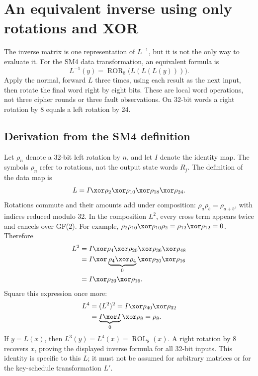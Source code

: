 \section{An equivalent inverse using only rotations and XOR}
\label{sec:sm4_inverse_rotations}
The inverse matrix is one representation of $L^{-1}$, but it is not the only
way to evaluate it. For the SM4 data transformation, an equivalent formula is
\[
\boxed{L^{-1}(y)=\operatorname{ROR}_8\bigl(L(L(L(y)))\bigr).}
\]
Apply the normal, forward $L$ three times, using each result as the next input,
then rotate the final word right by eight bits. These are local word operations,
not three cipher rounds or three fault observations. On 32-bit words a right
rotation by 8 equals a left rotation by 24.

\subsection{Derivation from the SM4 definition}
Let $\rho_n$ denote a 32-bit left rotation by $n$, and let $I$ denote the identity
map. The symbols $\rho_n$ refer to rotations, not the output state words $R_j$.
The definition of the data map is
\[
L=I\xor\rho_2\xor\rho_{10}\xor\rho_{18}\xor\rho_{24}.
\]
Rotations commute and their amounts add under composition:
$\rho_a\rho_b=\rho_{a+b}$, with indices reduced modulo 32.
In the composition $L^2$, every cross term appears twice and cancels over GF(2).
For example, $\rho_2\rho_{10}\xor\rho_{10}\rho_2
=\rho_{12}\xor\rho_{12}=0$. Therefore
\[
\begin{aligned}
L^2&=I\xor\rho_4\xor\rho_{20}\xor\rho_{36}\xor\rho_{48}\\
&=I\xor\underbrace{\rho_4\xor\rho_4}_{0}\xor\rho_{20}\xor\rho_{16}\\
&=I\xor\rho_{20}\xor\rho_{16}.
\end{aligned}
\]
Square this expression once more:
\[
\begin{aligned}
L^4&=(L^2)^2=I\xor\rho_{40}\xor\rho_{32}\\
&=\underbrace{I\xor I}_{0}\xor\rho_8=\rho_8.
\end{aligned}
\]
If $y=L(x)$, then $L^3(y)=L^4(x)=\operatorname{ROL}_8(x)$.
A right rotation by 8 recovers $x$, proving the displayed inverse formula for
all 32-bit inputs. This identity is specific to this $L$; it must not be assumed
for arbitrary matrices or for the key-schedule transformation $L'$.

